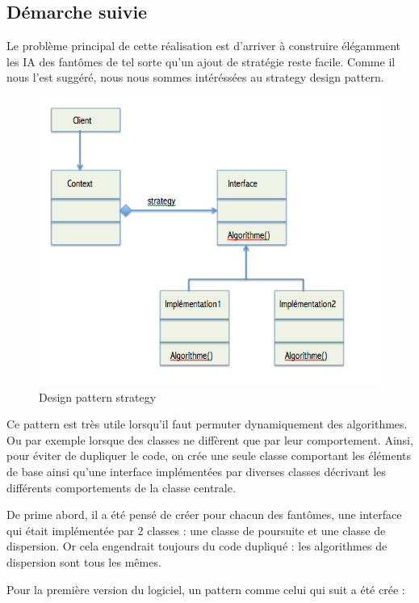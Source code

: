\documentclass[a4paper,12pt]{report} %
\begin{document}
\subsection{Démarche suivie}
Le problème principal de cette réalisation est d'arriver à construire élégamment les IA des fantômes de tel sorte qu'un ajout de stratégie reste facile.
Comme il nous l'est suggéré, nous nous sommes intéréssées au strategy design pattern.

\begin{figure}[!h] %
		\centering
		\includegraphics[scale=0.7]{ressources/StrategyDesignPattern.png}
		\caption{Design pattern strategy}
\end{figure} 



Ce pattern est très utile lorsqu'il faut permuter dynamiquement des algorithmes.
Ou par exemple lorsque des classes ne diffèrent que par leur comportement. Ainsi, pour éviter de dupliquer le code, on crée une seule classe comportant les éléments de base ainsi qu'une interface implémentées par diverses classes décrivant les différents comportements de la classe centrale.

De prime abord, il a été pensé de créer pour chacun des fantômes, une interface qui était implémentée par 2 classes : une classe de poursuite et une classe de dispersion.
Or cela engendrait toujours du code dupliqué : les algorithmes de dispersion sont tous les mêmes.

Pour la première version du logiciel, un pattern comme celui qui suit a été crée :
\end{document}
